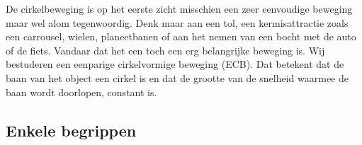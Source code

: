\documentclass{ximera}
\begin{document}
	\author{Bart Lambregs}
    \xmsource\xmuitleg

De cirkelbeweging is op het eerste zicht misschien een zeer eenvoudige beweging maar wel alom tegenwoordig. Denk maar aan een tol, een kermisattractie zoals een carrousel, wielen, planeetbanen of aan het nemen van een bocht met de auto of de fiets. Vandaar dat het een toch een erg belangrijke beweging is. Wij bestuderen een eenparige cirkelvormige beweging (ECB). Dat betekent dat de baan van het object een cirkel is en dat de grootte van de snelheid waarmee de baan wordt doorlopen, constant is.

\subsection{Enkele begrippen}
\end{document}
